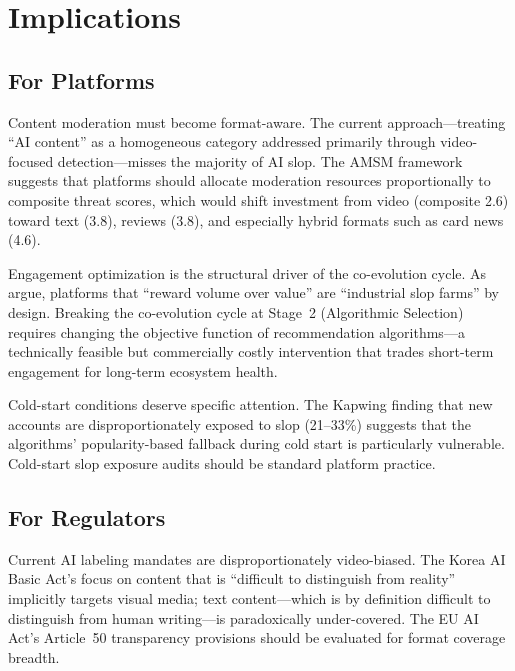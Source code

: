 \documentclass[12pt,a4paper]{article}
\begin{document}
\section{Implications}
\label{sec:implications}

\subsection{For Platforms}

Content moderation must become format-aware. The current approach---treating ``AI content'' as a homogeneous category addressed primarily through video-focused detection---misses the majority of AI slop. The AMSM framework suggests that platforms should allocate moderation resources proportionally to composite threat scores, which would shift investment from video (composite 2.6) toward text (3.8), reviews (3.8), and especially hybrid formats such as card news (4.6).

Engagement optimization is the structural driver of the co-evolution cycle. As \textcite{MadsenPuyt2025} argue, platforms that ``reward volume over value'' are ``industrial slop farms'' by design. Breaking the co-evolution cycle at Stage~2 (Algorithmic Selection) requires changing the objective function of recommendation algorithms---a technically feasible but commercially costly intervention that trades short-term engagement for long-term ecosystem health.

Cold-start conditions deserve specific attention. The Kapwing finding that new accounts are disproportionately exposed to slop (21--33\%) suggests that the algorithms' popularity-based fallback during cold start is particularly vulnerable. Cold-start slop exposure audits should be standard platform practice.

\subsection{For Regulators}

Current AI labeling mandates are disproportionately video-biased. The Korea AI Basic Act's focus on content that is ``difficult to distinguish from reality'' implicitly targets visual media; text content---which is by definition difficult to distinguish from human writing---is paradoxically under-covered. The EU AI Act's Article~50 transparency provisions should be evaluated for format coverage breadth.
\end{document}
